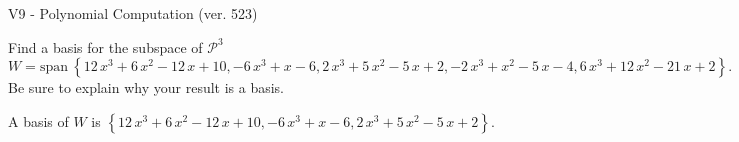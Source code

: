 \begin{exercise}
  \begin{exerciseTitle}V9 - Polynomial Computation (ver. 523)\end{exerciseTitle}
  \begin{exerciseStatement}
    Find a basis for the subspace of \(\mathcal{P}^3\) 
\[W=\mathrm{span}\ \left\{12 \, x^{3} + 6 \, x^{2} - 12 \, x + 10 , -6 \, x^{3} + x - 6 , 2 \, x^{3} + 5 \, x^{2} - 5 \, x + 2 , -2 \, x^{3} + x^{2} - 5 \, x - 4 , 6 \, x^{3} + 12 \, x^{2} - 21 \, x + 2\right\}.\]
 Be sure to explain why your result is a basis.


  \end{exerciseStatement}
  \begin{exerciseAnswer}
   A basis of \(W\) is  \(\left\{12 \, x^{3} + 6 \, x^{2} - 12 \, x + 10 , -6 \, x^{3} + x - 6 , 2 \, x^{3} + 5 \, x^{2} - 5 \, x + 2\right\}\).
  


  \end{exerciseAnswer}
\end{exercise}